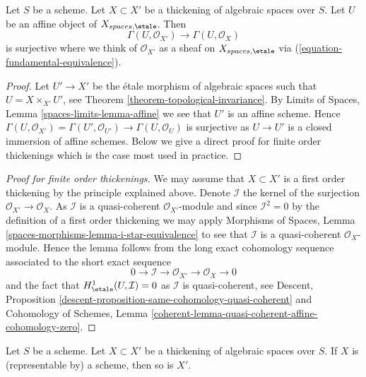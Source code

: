\begin{lemma}
\label{lemma-first-order-thickening-surjective}
Let $S$ be a scheme. Let $X \subset X'$ be a thickening
of algebraic spaces over $S$. Let $U$ be an affine object of
$X_{spaces, \etale}$. Then
$$
\Gamma(U, \mathcal{O}_{X'}) \to \Gamma(U, \mathcal{O}_X)
$$
is surjective where we think of $\mathcal{O}_{X'}$ as a sheaf on
$X_{spaces, \etale}$ via (\ref{equation-fundamental-equivalence}).
\end{lemma}

\begin{proof}
Let $U' \to X'$ be the \'etale morphism of algebraic spaces such that
$U = X \times_{X'} U'$, see Theorem \ref{theorem-topological-invariance}.
By Limits of Spaces, Lemma \ref{spaces-limits-lemma-affine} we see
that $U'$ is an affine scheme. Hence
$\Gamma(U, \mathcal{O}_{X'}) = \Gamma(U', \mathcal{O}_{U'}) \to
\Gamma(U, \mathcal{O}_U)$
is surjective as $U \to U'$ is a closed immersion of affine schemes.
Below we give a direct proof for finite order thickenings
which is the case most used in practice.
\end{proof}

\begin{proof}[Proof for finite order thickenings]
We may assume that $X \subset X'$ is a first order thickening by the
principle explained above. Denote $\mathcal{I}$ the kernel of the surjection
$\mathcal{O}_{X'} \to \mathcal{O}_X$. As $\mathcal{I}$ is a quasi-coherent
$\mathcal{O}_{X'}$-module and since $\mathcal{I}^2 = 0$ by the definition
of a first order thickening we may apply
Morphisms of Spaces, Lemma
\ref{spaces-morphisms-lemma-i-star-equivalence}
to see that $\mathcal{I}$ is a quasi-coherent $\mathcal{O}_X$-module.
Hence the lemma follows from the long exact cohomology sequence
associated to the short exact sequence
$$
0 \to \mathcal{I} \to \mathcal{O}_{X'} \to \mathcal{O}_X \to 0
$$
and the fact that $H^1_\etale(U, \mathcal{I}) = 0$ as
$\mathcal{I}$ is quasi-coherent, see
Descent, Proposition \ref{descent-proposition-same-cohomology-quasi-coherent}
and Cohomology of Schemes, Lemma
\ref{coherent-lemma-quasi-coherent-affine-cohomology-zero}.
\end{proof}

\begin{lemma}
\label{lemma-thickening-scheme}
Let $S$ be a scheme. Let $X \subset X'$ be a thickening of algebraic spaces
over $S$. If $X$ is (representable by) a scheme, then so is $X'$.
\end{lemma}

